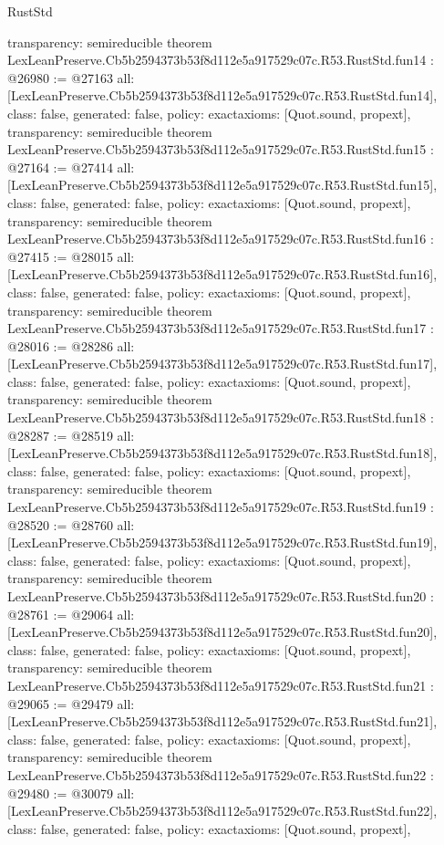 \begin{lexlean}{RustStd}
\begin{coremodule}
{  transparency: semireducible
}
theorem LexLeanPreserve.Cb5b2594373b53f8d112e5a917529c07c.R53.RustStd.fun14 : @26980 := @27163 {
  all: [LexLeanPreserve.Cb5b2594373b53f8d112e5a917529c07c.R53.RustStd.fun14],
  class: false,
  generated: false,
  policy: exact{axioms: [Quot.sound, propext]},
  transparency: semireducible
}
theorem LexLeanPreserve.Cb5b2594373b53f8d112e5a917529c07c.R53.RustStd.fun15 : @27164 := @27414 {
  all: [LexLeanPreserve.Cb5b2594373b53f8d112e5a917529c07c.R53.RustStd.fun15],
  class: false,
  generated: false,
  policy: exact{axioms: [Quot.sound, propext]},
  transparency: semireducible
}
theorem LexLeanPreserve.Cb5b2594373b53f8d112e5a917529c07c.R53.RustStd.fun16 : @27415 := @28015 {
  all: [LexLeanPreserve.Cb5b2594373b53f8d112e5a917529c07c.R53.RustStd.fun16],
  class: false,
  generated: false,
  policy: exact{axioms: [Quot.sound, propext]},
  transparency: semireducible
}
theorem LexLeanPreserve.Cb5b2594373b53f8d112e5a917529c07c.R53.RustStd.fun17 : @28016 := @28286 {
  all: [LexLeanPreserve.Cb5b2594373b53f8d112e5a917529c07c.R53.RustStd.fun17],
  class: false,
  generated: false,
  policy: exact{axioms: [Quot.sound, propext]},
  transparency: semireducible
}
theorem LexLeanPreserve.Cb5b2594373b53f8d112e5a917529c07c.R53.RustStd.fun18 : @28287 := @28519 {
  all: [LexLeanPreserve.Cb5b2594373b53f8d112e5a917529c07c.R53.RustStd.fun18],
  class: false,
  generated: false,
  policy: exact{axioms: [Quot.sound, propext]},
  transparency: semireducible
}
theorem LexLeanPreserve.Cb5b2594373b53f8d112e5a917529c07c.R53.RustStd.fun19 : @28520 := @28760 {
  all: [LexLeanPreserve.Cb5b2594373b53f8d112e5a917529c07c.R53.RustStd.fun19],
  class: false,
  generated: false,
  policy: exact{axioms: [Quot.sound, propext]},
  transparency: semireducible
}
theorem LexLeanPreserve.Cb5b2594373b53f8d112e5a917529c07c.R53.RustStd.fun20 : @28761 := @29064 {
  all: [LexLeanPreserve.Cb5b2594373b53f8d112e5a917529c07c.R53.RustStd.fun20],
  class: false,
  generated: false,
  policy: exact{axioms: [Quot.sound, propext]},
  transparency: semireducible
}
theorem LexLeanPreserve.Cb5b2594373b53f8d112e5a917529c07c.R53.RustStd.fun21 : @29065 := @29479 {
  all: [LexLeanPreserve.Cb5b2594373b53f8d112e5a917529c07c.R53.RustStd.fun21],
  class: false,
  generated: false,
  policy: exact{axioms: [Quot.sound, propext]},
  transparency: semireducible
}
theorem LexLeanPreserve.Cb5b2594373b53f8d112e5a917529c07c.R53.RustStd.fun22 : @29480 := @30079 {
  all: [LexLeanPreserve.Cb5b2594373b53f8d112e5a917529c07c.R53.RustStd.fun22],
  class: false,
  generated: false,
  policy: exact{axioms: [Quot.sound, propext]},
}
\end{coremodule}
\end{lexlean}
